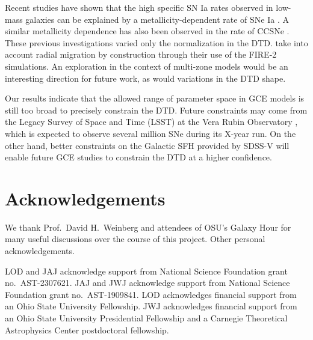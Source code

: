 \documentclass[twocolumn,twocolappendix,linenumbers]{aastex631}
\newcommand{\todo}[1]{{\color{red}#1}}
\begin{document}
Recent studies have shown that the high specific SN Ia rates observed in low-mass galaxies \citep[e.g.,][]{Brown2019-ASASSNrates,Wiseman2021-DESRates} can be explained by a metallicity-dependent rate of SNe Ia \citep{Gandhi2022-MetallicityDependentRates,Johnson2023-Binaries}. A similar metallicity dependence has also been observed in the rate of CCSNe \citep{Pessi2023-MetalDepCCSNe}. 
These previous investigations varied only the normalization in the DTD. \citet{Gandhi2022-MetallicityDependentRates} take into account radial migration by construction through their use of the FIRE-2 simulations. An exploration in the context of multi-zone models would be an interesting direction for future work, as would variations in the DTD shape.

Our results indicate that the allowed range of parameter space in GCE models is still too broad to precisely constrain the DTD. Future constraints may come from the Legacy Survey of Space and Time (LSST) at the Vera Rubin Observatory \citep{Ivezic2019-LSST}, which is expected to observe several million SNe during its X-year run. On the other hand, better constraints on the Galactic SFH provided by SDSS-V \citep{Kollmeier2017-SDSS-V} will enable future GCE studies to constrain the DTD at a higher confidence.

\section*{Acknowledgements}

We thank Prof.\ David H.\ Weinberg and attendees of OSU's Galaxy Hour for many useful discussions over the course of this project.
\todo{Other personal acknowledgements.}

LOD and JAJ acknowledge support from National Science Foundation grant no.\ AST-2307621. JAJ and JWJ acknowledge support from National Science Foundation grant no.\ AST-1909841.
LOD acknowledges financial support from an Ohio State University Fellowship.
JWJ acknowledges financial support from an Ohio State University Presidential Fellowship and a Carnegie Theoretical Astrophysics Center postdoctoral fellowship.
\end{document}
